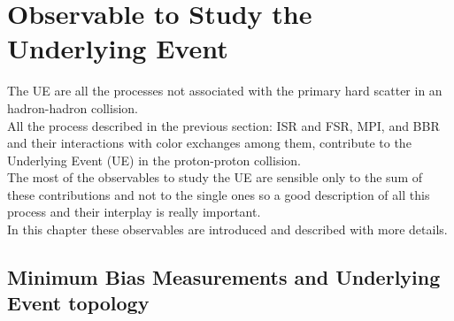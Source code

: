 
\chapter{Observable to Study the Underlying Event}
\label{chap:ObservabletoStudytheUnderlyingEvent}

The UE are all the processes not associated with the primary hard scatter in an hadron-hadron collision.
\\
All the process described in the previous section: ISR and FSR, MPI, and BBR and their interactions with color exchanges among them, contribute to the Underlying Event (UE) in the proton-proton collision.
\\
The most of the observables to study the UE are sensible only to the sum of these contributions and not to the single ones so a good description of all this process and their interplay is really important.
\\
In this chapter these observables are introduced and 
described with more details.

\section{Minimum Bias Measurements and Underlying Event topology}

